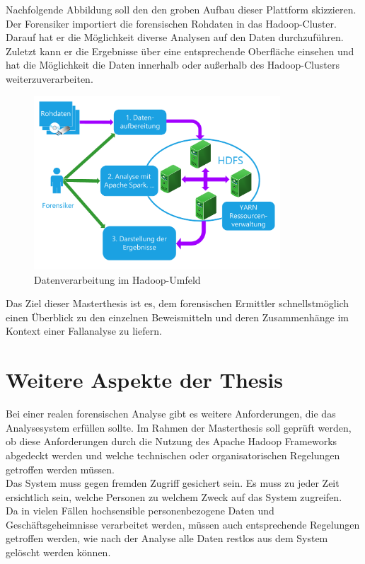 \documentclass[11pt,a4paper]{report} %
\begin{document}
\noindent
Nachfolgende Abbildung soll den den groben Aufbau dieser Plattform skizzieren. Der Forensiker importiert die forensischen Rohdaten in das Hadoop-Cluster. Darauf hat er die Möglichkeit diverse Analysen auf den Daten durchzuführen. Zuletzt kann er die Ergebnisse über eine entsprechende Oberfläche einsehen und hat die Möglichkeit die Daten innerhalb oder außerhalb des Hadoop-Clusters weiterzuverarbeiten.\\

\begin{figure}[ht]
  \centering
  \includegraphics[width=0.82\textwidth]{./resource/Hadoop-Struktur.pdf}
  \caption{Datenverarbeitung im Hadoop-Umfeld}
\end{figure}

\noindent
Das Ziel dieser Masterthesis ist es, dem forensischen Ermittler schnellstmöglich einen Überblick zu den einzelnen Beweismitteln und deren Zusammenhänge im Kontext einer Fallanalyse zu liefern. 

\section{Weitere Aspekte der Thesis}
Bei einer realen forensischen Analyse gibt es weitere Anforderungen, die das Analysesystem erfüllen sollte. Im Rahmen der Masterthesis soll geprüft werden, ob diese Anforderungen durch die Nutzung des Apache Hadoop Frameworks abgedeckt werden und welche technischen oder organisatorischen Regelungen getroffen werden müssen.\\
Das System muss gegen fremden Zugriff gesichert sein. Es muss zu jeder Zeit ersichtlich sein, welche Personen zu welchem Zweck auf das System zugreifen.\\

\noindent
Da in vielen Fällen hochsensible personenbezogene Daten und Geschäftsgeheimnisse verarbeitet werden, müssen auch entsprechende Regelungen getroffen werden, wie nach der Analyse alle Daten restlos aus dem System gelöscht werden können.\\
\end{document}
